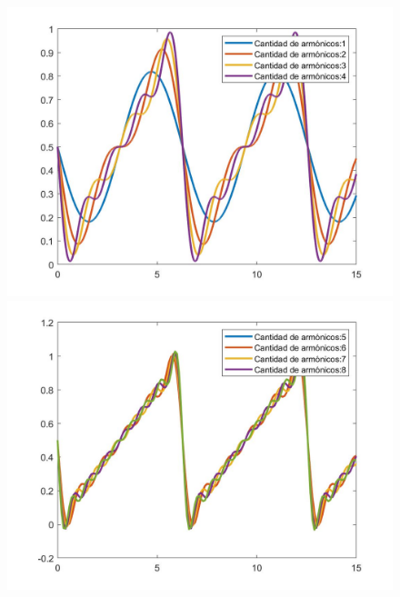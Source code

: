 \documentclass[../../ASSD_TP1_G7.tex]{subfiles}
\begin{document}
\begin{figure}[H]

\begin{centering}
\includegraphics[scale=0.24]{Imagenes/armonicos1a4}\includegraphics[scale=0.24]{Imagenes/armonicos4a8}
\par\end{centering}
\begin{centering}

\end{centering}
\end{figure}
\end{document}
